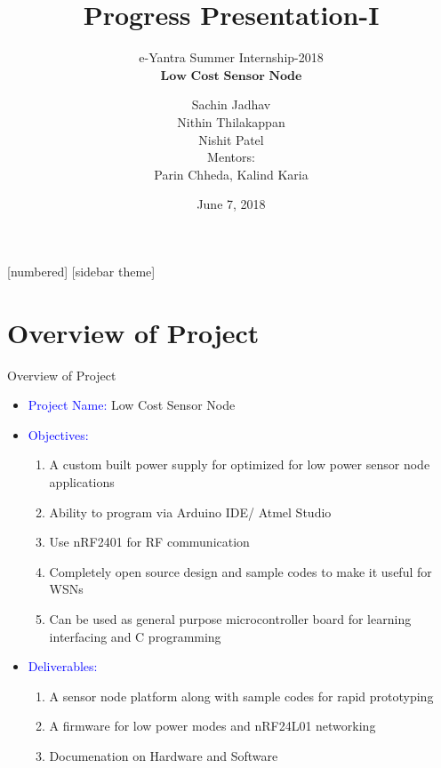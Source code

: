 \documentclass[10pt, a4paper]{beamer}
\begin{document}
	\title{Progress Presentation-I}
	\subtitle{e-Yantra Summer Internship-2018 \\ $ \textbf{Low Cost Sensor Node} $}
	\author{Sachin Jadhav\\Nithin Thilakappan\\Nishit Patel\\ \vspace{1em}
	Mentors:\\ Parin Chheda, Kalind Karia}
	\date{June 7, 2018}
	\frame{\titlepage}

[numbered]
[sidebar theme]
\section{Overview of Project}
\begin{frame}{Overview of Project}
	\begin{itemize}
		\item \textcolor{blue}{Project Name:} Low Cost Sensor Node
		\item \textcolor{blue}{Objectives:}
        	\begin{enumerate}
        		\item A custom built power supply for optimized for low power sensor node applications
				\item Ability to program via Arduino IDE/ Atmel Studio
				\item Use nRF2401 for RF communication
				\item Completely open source design and sample codes to make it useful for WSNs
				\item Can be used as general purpose microcontroller board for learning interfacing and C
programming
                \end{enumerate}
		\item \textcolor{blue}{Deliverables:}
        \begin{enumerate}
        		\item A sensor node platform along with sample codes for rapid prototyping
				\item A firmware for low power modes and nRF24L01 networking
				\item Documenation on Hardware and Software
			
                \end{enumerate} 
	\end{itemize}
\end{frame}
\end{document}
